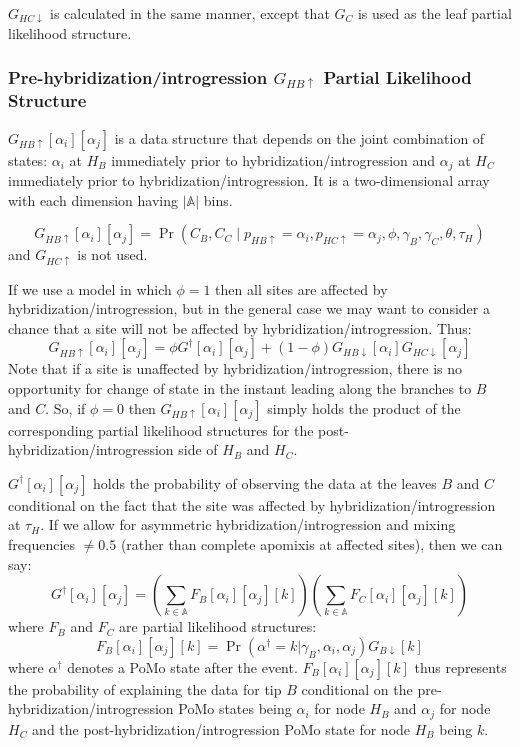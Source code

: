 \documentclass{article}
\begin{document}
$G_{HC\downarrow}$ is calculated in the same manner, except that $G_C$ is used as the leaf partial likelihood structure.

\subsubsection{Pre-hybridization/introgression $G_{HB\uparrow}$ Partial Likelihood Structure}
$G_{HB\uparrow}[\alpha_i][\alpha_j]$ is a data structure that depends on the joint combination of states: $\alpha_i$ at $H_B$ immediately prior to hybridization/introgression and $\alpha_j$ at $H_C$ immediately prior to hybridization/introgression. 
It is a two-dimensional array with each dimension having $|\mathbb{A}|$ bins.

$$G_{HB\uparrow}[\alpha_i][\alpha_j] = \Pr\left(C_B, C_C\mid p_{HB\uparrow}=\alpha_i, p_{HC\uparrow}=\alpha_j, \phi, \gamma_B, \gamma_C, \theta, \tau_H\right)$$
and
$G_{HC\uparrow}$ is not used.


If we use a model in which $\phi = 1$ then all sites are affected by hybridization/introgression, but in the general case we may want to consider a chance that a site will not be affected by hybridization/introgression.
Thus:
\begin{equation}
G_{HB\uparrow}[\alpha_i][\alpha_j] = \phi G^{\dag}[\alpha_i][\alpha_j] + \left(1-\phi\right)G_{HB\downarrow}[\alpha_i]G_{HC\downarrow}[\alpha_j]
\end{equation}
Note that if a site is unaffected by hybridization/introgression, there is no opportunity for change of state in the instant leading along the branches to $B$ and $C$.
So, if $\phi=0$ then $G_{HB\uparrow}[\alpha_i][\alpha_j]$ simply holds the product of the corresponding partial likelihood structures for the post-hybridization/introgression side of $H_B$ and $H_C$.

$G^{\dag}[\alpha_i][\alpha_j]$ holds the probability of observing the data at the leaves $B$ and $C$ conditional on the fact that the site was affected by hybridization/introgression at $\tau_{H}$.
If we allow for asymmetric hybridization/introgression and mixing frequencies $\neq 0.5$ (rather than complete apomixis at affected sites), then we can say:
\begin{equation}
G^{\dag}[\alpha_i][\alpha_j] = \left(\sum_{k\in \mathbb{A}}F_B[\alpha_i][\alpha_j][k]\right)
                        \left(\sum_{k\in \mathbb{A}}F_C[\alpha_i][\alpha_j][k]\right)
\end{equation}
where $F_B$ and $F_C$ are partial likelihood structures:
\begin{equation}
F_B[\alpha_i][\alpha_j][k] = \Pr\left(\alpha^{\dag}=k | \gamma_B, \alpha_i, \alpha_j\right)G_{B\downarrow}[k]
\end{equation}
where $\alpha^{\dag}$ denotes a PoMo state after the event.
$F_B[\alpha_i][\alpha_j][k]$ thus represents the probability of explaining the data for tip $B$ conditional on the pre-hybridization/introgression PoMo states being $\alpha_i$ for node $H_B$ and $\alpha_j$ for node $H_C$ and the post-hybridization/introgression PoMo state for node $H_B$ being $k$.
\end{document}
